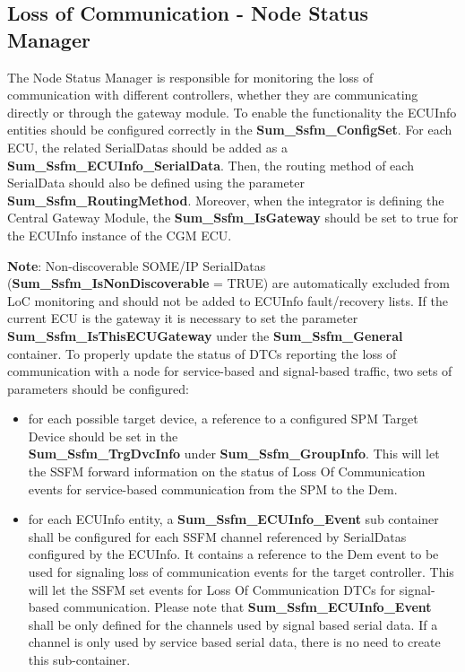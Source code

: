 \subsection{Loss of Communication - Node Status Manager}
\label{subsec:NodeStatusManager}

The Node Status Manager is responsible for monitoring the loss of communication with different controllers, whether they are communicating directly or through the gateway module.
To enable the functionality the ECUInfo entities should be configured correctly in the \textbf{Sum\_Ssfm\_ConfigSet}.
For each ECU, the related SerialDatas should be added as a \textbf{Sum\_Ssfm\_ECUInfo\_SerialData}. 
Then, the routing method of each SerialData should also be defined using the parameter \\ \textbf{Sum\_Ssfm\_RoutingMethod}.
Moreover, when the integrator is defining the Central Gateway Module, the \textbf{Sum\_Ssfm\_IsGateway} should be set to true for the ECUInfo instance of the CGM ECU.

\textbf{Note}: Non-discoverable SOME/IP SerialDatas (\textbf{Sum\_Ssfm\_IsNonDiscoverable} = TRUE) are automatically excluded from LoC monitoring and should not be added to ECUInfo fault/recovery lists.
If the current ECU is the gateway it is necessary to set the parameter \textbf{Sum\_Ssfm\_IsThisECUGateway} under the \textbf{Sum\_Ssfm\_General} container.
To properly update the status of DTCs reporting the loss of communication with a node for service-based and signal-based traffic, two sets of parameters should be configured:
\begin{itemize}
	\item for each possible target device, a reference to a configured SPM Target Device should be set in 
			the \\ \textbf{Sum\_Ssfm\_TrgDvcInfo} under \textbf{Sum\_Ssfm\_GroupInfo}.
	      	This will let the SSFM forward information on the status of Loss Of Communication events for 
			service-based communication from the SPM to the Dem.
	\item for each ECUInfo entity, a \textbf{Sum\_Ssfm\_ECUInfo\_Event} sub container shall be 
			configured for each SSFM channel referenced by SerialDatas configured by the ECUInfo.
	      	It contains a reference to the Dem event to be used for signaling loss of communication events 
		  	for the target controller.
	      	This will let the SSFM set events for Loss Of Communication DTCs for signal-based communication.
			Please note that \textbf{Sum\_Ssfm\_ECUInfo\_Event} shall be only defined for the channels used by signal based serial data. 
			If a channel is only used by service based serial data, there is no need to create this sub-container.
\end{itemize}

